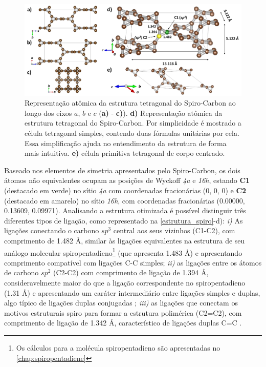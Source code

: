 	\begin{figure}[hbt!]
		\centering
		\includegraphics[width=1\linewidth]{capitulos/fig/results1/estrutura_spiro}
		\caption{Representação atômica da estrutura tetragonal do Spiro-Carbon ao longo dos eixos $a$, $b$ e $c$ (\textbf{a)} - \textbf{c)}). \textbf{d)} Representação atômica da estrutura tetragonal do Spiro-Carbon. Por simplicidade é mostrado a célula tetragonal simples, contendo duas fórmulas unitárias por cela. Essa simplificação ajuda no entendimento da estrutura de forma mais intuitiva. \textbf{e)} célula primitiva tetragonal de corpo centrado.}
		\label{estrutura_spiro}
	\end{figure}

	Baseado nos elementos de simetria apresentados pelo Spiro-Carbon, os dois átomos não equivalentes ocupam as posições de Wyckoff \textit{4a} e \textit{16h}, estando \textbf{C1} (destacado em verde) no sítio \textit{4a} com coordenadas fracionárias (0, 0, 0) e \textbf{C2} (destacado em amarelo) no sítio \textit{16h}, com coordenadas fracionárias (0.00000,  0.13609,  0.09971). Analisando a estrutura otimizada é possível distinguir três diferentes tipos de ligação, como representado na \autoref{estrutura_spiro}-d): \textit{i)} As ligações conectando o carbono $sp^3$ central aos seus vizinhos (C1-C2), com comprimento de 1.482 \AA{}, similar às ligações equivalentes na estrutura de seu análogo molecular spiropentadieno\footnote{Os cálculos para a molécula spiropentadieno são apresentadas no \autoref{chap:spiropentadiene}} (que apresenta 1.483 \AA{}) e apresentando comprimento compatível com ligações C-C simples; \textit{ii)} as ligações entre os átomos de carbono $sp^2$ (C2-C2) com comprimento de ligação de 1.394 \AA{}, consideravelmente maior do que a ligação correspondente no spiropentadieno (1.31 \AA{}) e apresentando um caráter intermediário entre ligações simples e duplas, algo típico de ligações duplas conjugadas \cite{lide1962survey}; \textit{iii)} as ligações que conectam os motivos estruturais spiro para formar a estrutura polimérica (C2=C2), com comprimento de ligação de 1.342 \AA, característico de ligações duplas C=C \cite{zavitsas2003relation,lide1962survey}.  
	
